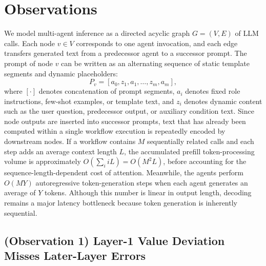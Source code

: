 \documentclass[letterpaper]{article} %
\begin{document}
\section{Observations}

We model multi-agent inference as a directed acyclic graph $G=(V,E)$ of LLM calls. Each node $v\in V$ corresponds to one agent invocation, and each edge transfers generated text from a predecessor agent to a successor prompt. The prompt of node $v$ can be written as an alternating sequence of static template segments and dynamic placeholders:
\begin{equation}
P_v = [a_0, z_1, a_1, \ldots, z_m, a_m],
\label{eq:prompt-decomposition}
\end{equation}
where $[\cdot]$ denotes concatenation of prompt segments, $a_i$ denotes fixed role instructions, few-shot examples, or template text, and $z_i$ denotes dynamic content such as the user question, predecessor output, or auxiliary condition text. Since node outputs are inserted into successor prompts, text that has already been computed within a single workflow execution is repeatedly encoded by downstream nodes. If a workflow contains $M$ sequentially related calls and each step adds an average context length $L$, the accumulated prefill token-processing volume is approximately $O(\sum_i iL)=O(M^2L)$, before accounting for the sequence-length-dependent cost of attention. Meanwhile, the agents perform $O(MY)$ autoregressive token-generation steps when each agent generates an average of $Y$ tokens. Although this number is linear in output length, decoding remains a major latency bottleneck because token generation is inherently sequential.

\subsection{(Observation 1) Layer-1 Value Deviation Misses Later-Layer Errors}
\end{document}
